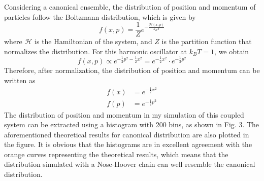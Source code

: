 \documentclass{article}
\begin{document}
Considering a canonical ensemble, the distribution of position and momentum of particles follow the Boltzmann distribution, which is given by
\begin{equation}
    f(x, p) = \frac{1}{Z} e^{-\frac{\mathcal{H}(x, p)}{k_B T}}
\end{equation}
where $\mathcal{H}$ is the Hamiltonian of the system, and $Z$ is the partition function that normalizes the distribution. For this harmonic oscillator at $k_BT = 1$, we obtain
\begin{equation}
    f(x,p) \propto e^{-\frac{1}{2} p^2 - \frac{1}{2} x^2} = e^{-\frac{1}{2} x^2} \cdot e^{-\frac{1}{2} p^2}
\end{equation}
Therefore, after normalization, the distribution of position and momentum can be written as
\begin{equation}
    \begin{aligned}
        f(x) & = e^{-\frac{1}{2} x^2} \\
        f(p) & = e^{-\frac{1}{2} p^2}
    \end{aligned}
\end{equation}
The distribution of position and momentum in my simulation of this coupled system can be extracted using a histogram with 200 bins, as shown in Fig. 3. The aforementioned theoretical results for canonical distribution are also plotted in the figure. It is obvious that the histograms are in excellent agreement with the orange curves representing the theoretical results, which means that the distribution simulated with a Nose-Hoover chain can well resemble the canonical distribution.
\end{document}
